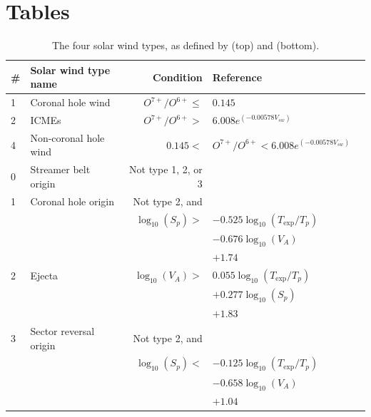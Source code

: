 \documentclass[utf8]{frontiersSCNS} %
\begin{document}

\section*{Tables}

\begin{table}\centering
	\begin{tabular}{@{}llrll@{}}
		\toprule
		\# & Solar wind type name & Condition & Reference \\
		\midrule
		1 & Coronal hole wind & $O^{7+}/O^{6+}\leq$&$0.145$ & \citep{Zhao2009} \\
		2 & ICMEs & $O^{7+}/O^{6+}>$&$6.008e^{(-0.00578V_{sw})}$ & \\
		4 & Non-coronal hole wind & $0.145<$&$ O^{7+}/O^{6+} < 6.008e^{(-0.00578V_{sw})} $ & \\
		\midrule
		0 & Streamer belt origin & Not type 1, 2, or 3 & & \citep{Xu2015b} \\
		1 & Coronal hole origin & Not type 2, and & & \\
		  &  & $\log_{10}(S_p)>$&$ -0.525 \log_{10}(T_{\text{exp}}/T_p)$\\
		  &  & &$- 0.676\log_{10}(V_A)$ \\
		  &  & &$+ 1.74$ & \\
		2 & Ejecta & $\log_{10}(V_A)>$ & $ 0.055\log_{10}(T_{\text{exp}}/T_p)$ \\
		  &  & & $+ 0.277 \log_{10}(S_p)$ \\
		  &  & & $+ 1.83$ & \\
		3 & Sector reversal origin & Not type 2, and & & \\
		  & & $\log_{10}(S_p)<$&$ -0.125 \log_{10}(T_{\text{exp}}/T_p)$ \\
		  & & & $- 0.658\log_{10}(V_A)$ \\
		  & & & $+ 1.04$ &  \\
		\bottomrule
	\end{tabular}
	\caption{The four solar wind types, as defined by \citep{Zhao2009} (top) and \citep{Xu2015b} (bottom).}
	\label{tab:swtypes}
\end{table}
\end{document}
